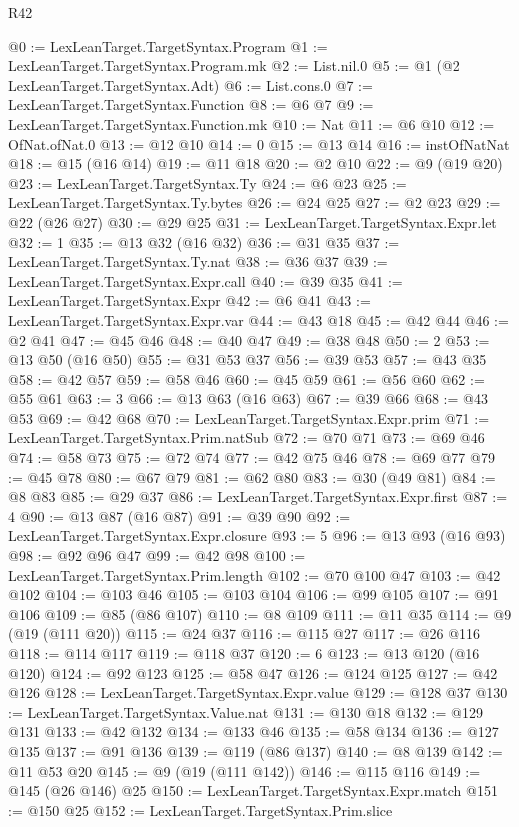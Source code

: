 \begin{lexlean}{R42}
\begin{coremodule}
@0 := LexLeanTarget.TargetSyntax.Program
@1 := LexLeanTarget.TargetSyntax.Program.mk
@2 := List.nil.{0}
@5 := @1 (@2 LexLeanTarget.TargetSyntax.Adt)
@6 := List.cons.{0}
@7 := LexLeanTarget.TargetSyntax.Function
@8 := @6 @7
@9 := LexLeanTarget.TargetSyntax.Function.mk
@10 := Nat
@11 := @6 @10
@12 := OfNat.ofNat.{0}
@13 := @12 @10
@14 := 0
@15 := @13 @14
@16 := instOfNatNat
@18 := @15 (@16 @14)
@19 := @11 @18
@20 := @2 @10
@22 := @9 (@19 @20)
@23 := LexLeanTarget.TargetSyntax.Ty
@24 := @6 @23
@25 := LexLeanTarget.TargetSyntax.Ty.bytes
@26 := @24 @25
@27 := @2 @23
@29 := @22 (@26 @27)
@30 := @29 @25
@31 := LexLeanTarget.TargetSyntax.Expr.let
@32 := 1
@35 := @13 @32 (@16 @32)
@36 := @31 @35
@37 := LexLeanTarget.TargetSyntax.Ty.nat
@38 := @36 @37
@39 := LexLeanTarget.TargetSyntax.Expr.call
@40 := @39 @35
@41 := LexLeanTarget.TargetSyntax.Expr
@42 := @6 @41
@43 := LexLeanTarget.TargetSyntax.Expr.var
@44 := @43 @18
@45 := @42 @44
@46 := @2 @41
@47 := @45 @46
@48 := @40 @47
@49 := @38 @48
@50 := 2
@53 := @13 @50 (@16 @50)
@55 := @31 @53 @37
@56 := @39 @53
@57 := @43 @35
@58 := @42 @57
@59 := @58 @46
@60 := @45 @59
@61 := @56 @60
@62 := @55 @61
@63 := 3
@66 := @13 @63 (@16 @63)
@67 := @39 @66
@68 := @43 @53
@69 := @42 @68
@70 := LexLeanTarget.TargetSyntax.Expr.prim
@71 := LexLeanTarget.TargetSyntax.Prim.natSub
@72 := @70 @71
@73 := @69 @46
@74 := @58 @73
@75 := @72 @74
@77 := @42 @75 @46
@78 := @69 @77
@79 := @45 @78
@80 := @67 @79
@81 := @62 @80
@83 := @30 (@49 @81)
@84 := @8 @83
@85 := @29 @37
@86 := LexLeanTarget.TargetSyntax.Expr.first
@87 := 4
@90 := @13 @87 (@16 @87)
@91 := @39 @90
@92 := LexLeanTarget.TargetSyntax.Expr.closure
@93 := 5
@96 := @13 @93 (@16 @93)
@98 := @92 @96 @47
@99 := @42 @98
@100 := LexLeanTarget.TargetSyntax.Prim.length
@102 := @70 @100 @47
@103 := @42 @102
@104 := @103 @46
@105 := @103 @104
@106 := @99 @105
@107 := @91 @106
@109 := @85 (@86 @107)
@110 := @8 @109
@111 := @11 @35
@114 := @9 (@19 (@111 @20))
@115 := @24 @37
@116 := @115 @27
@117 := @26 @116
@118 := @114 @117
@119 := @118 @37
@120 := 6
@123 := @13 @120 (@16 @120)
@124 := @92 @123
@125 := @58 @47
@126 := @124 @125
@127 := @42 @126
@128 := LexLeanTarget.TargetSyntax.Expr.value
@129 := @128 @37
@130 := LexLeanTarget.TargetSyntax.Value.nat
@131 := @130 @18
@132 := @129 @131
@133 := @42 @132
@134 := @133 @46
@135 := @58 @134
@136 := @127 @135
@137 := @91 @136
@139 := @119 (@86 @137)
@140 := @8 @139
@142 := @11 @53 @20
@145 := @9 (@19 (@111 @142))
@146 := @115 @116
@149 := @145 (@26 @146) @25
@150 := LexLeanTarget.TargetSyntax.Expr.match
@151 := @150 @25
@152 := LexLeanTarget.TargetSyntax.Prim.slice

\end{coremodule}
\end{lexlean}
